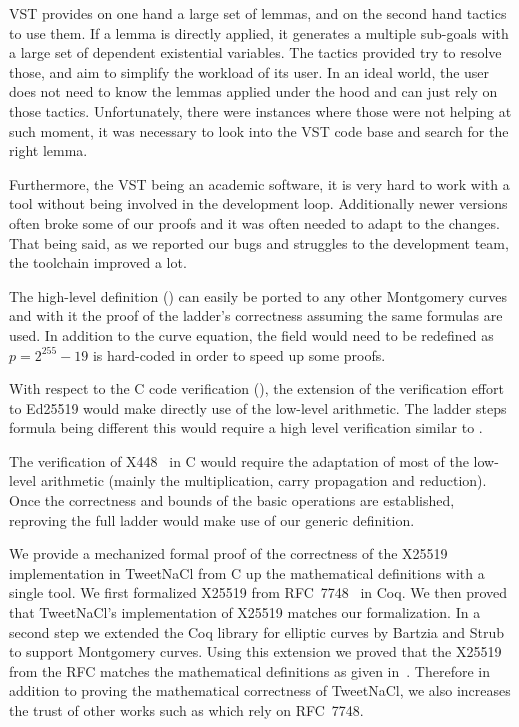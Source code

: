 VST provides on one hand a large set of lemmas, and on the second hand tactics to use them.
If a lemma is directly applied, it generates a multiple sub-goals with a large set of dependent existential variables.
The tactics provided try to resolve those, and aim to simplify the workload of its user.
In an ideal world, the user does not need to know the lemmas applied under the hood and can just rely on those tactics.
Unfortunately, there were instances where those were not helping
at such moment, it was necessary to look into the VST code base and search for the right lemma.

Furthermore, the VST being an academic software, it is very hard to work with a tool
without being involved in the development loop. Additionally newer versions often broke
some of our proofs and it was often needed to adapt to the changes. That being said,
as we reported our bugs and struggles to the development team, the toolchain improved a lot.

The high-level definition () can easily be ported to any
other Montgomery curves and with it the proof of the ladder's correctness
assuming the same formulas are used.
In addition to the curve equation, the field  would need to be redefined
as $p=2^{255}-19$ is hard-coded in order to speed up some proofs.

With respect to the C code verification (), the extension of
the verification effort to Ed25519 would make directly use of the low-level
arithmetic. The ladder steps formula being different this would require a high
level verification similar to .

The verification of \eg X448~\cite{cryptoeprint:2015:625,rfc7748} in C would
require the adaptation of most of the low-level arithmetic (mainly the
multiplication, carry propagation and reduction).
Once the correctness and bounds of the basic operations are established,
reproving the full ladder would make use of our generic definition.

We provide a mechanized formal proof of the correctness of the X25519
implementation in TweetNaCl from C up the mathematical definitions with a single tool.
We first formalized X25519 from RFC~7748~\cite{rfc7748} in Coq.
We then proved that TweetNaCl's implementation of X25519 matches our formalization.
In a second step we extended the Coq library for elliptic curves \cite{BartziaS14}
by Bartzia and Strub to support Montgomery curves.
Using this extension we proved that the X25519 from the RFC matches the
mathematical definitions as given in~\cite[Sec.~2]{Ber06}.
Therefore in addition to proving the mathematical correctness of TweetNaCl,
we also increases the trust of other works such as
\cite{zinzindohoue2017hacl,Erbsen2016SystematicSO} which rely on RFC~7748.
